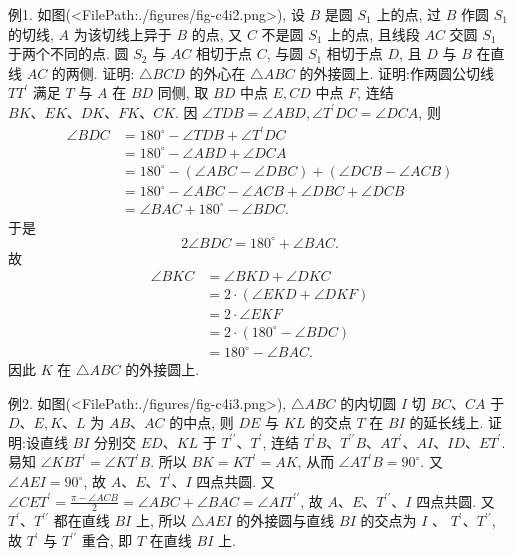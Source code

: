 例1. 如图(<FilePath:./figures/fig-c4i2.png>), 设 $B$ 是圆 $S_1$ 上的点, 过 $B$ 作圆 $S_1$ 的切线, $A$ 为该切线上异于 $B$ 的点, 又 $C$ 不是圆 $S_1$ 上的点, 且线段 $A C$ 交圆 $S_1$ 于两个不同的点.
圆 $S_2$ 与 $A C$ 相切于点 $C$, 与圆 $S_1$ 相切于点 $D$, 且 $D$ 与 $B$ 在直线 $A C$ 的两侧.
证明: $\triangle B C D$ 的外心在 $\triangle A B C$ 的外接圆上.
证明:作两圆公切线 $T T^{\prime}$ 满足 $T$ 与 $A$ 在 $B D$ 同侧, 取 $B D$ 中点 $E, C D$ 中点 $F$, 连结$B K 、 E K 、 D K 、 F K 、 C K$.
因 $\angle T D B=\angle A B D, \angle T^{\prime} D C=\angle D C A$, 则
$$
\begin{aligned}
\angle B D C & =180^{\circ}-\angle T D B+\angle T^{\prime} D C \\
& =180^{\circ}-\angle A B D+\angle D C A \\
& =180^{\circ}-(\angle A B C-\angle D B C)+(\angle D C B-\angle A C B) \\
& =180^{\circ}-\angle A B C-\angle A C B+\angle D B C+\angle D C B \\
& =\angle B A C+180^{\circ}-\angle B D C .
\end{aligned}
$$
于是
$$
2 \angle B D C=180^{\circ}+\angle B A C .
$$
故
$$
\begin{aligned}
\angle B K C & =\angle B K D+\angle D K C \\
& =2 \cdot(\angle E K D+\angle D K F) \\
& =2 \cdot \angle E K F \\
& =2 \cdot\left(180^{\circ}-\angle B D C\right) \\
& =180^{\circ}-\angle B A C .
\end{aligned}
$$
因此 $K$ 在 $\triangle A B C$ 的外接圆上.



例2. 如图(<FilePath:./figures/fig-c4i3.png>), $\triangle A B C$ 的内切圆 $I$ 切 $B C 、 C A$ 于 $D 、 E, K 、 L$ 为 $A B 、 A C$ 的中点, 则 $D E$ 与 $K L$ 的交点 $T$ 在 $B I$ 的延长线上.
证明:设直线 $B I$ 分别交 $E D 、 K L$ 于 $T^{\prime \prime} 、 T^{\prime}$, 连结 $T^{\prime} B 、 T^{\prime \prime} B 、 A T^{\prime} 、 A I 、 I D 、 E T^{\prime}$.
易知 $\angle K B T^{\prime}=\angle K T^{\prime} B$.
所以 $B K=K T^{\prime}=A K$, 从而 $\angle A T^{\prime} B=90^{\circ}$.
又 $\angle A E I=90^{\circ}$, 故 $A 、 E 、 T^{\prime} 、 I$ 四点共圆.
又 $\angle C E T^{\prime}=\frac{\pi-\angle A C B}{2}=\angle A B C+\angle B A C=\angle A I T^{\prime \prime}$,
故 $A 、 E 、 T^{\prime \prime} 、 I$ 四点共圆.
又 $T^{\prime} 、 T^{\prime \prime}$ 都在直线 $B I$ 上, 所以 $\triangle A E I$ 的外接圆与直线 $B I$ 的交点为 $I$ 、 $T^{\prime} 、 T^{\prime \prime}$, 故 $T^{\prime}$ 与 $T^{\prime \prime}$ 重合, 即 $T$ 在直线 $B I$ 上.



